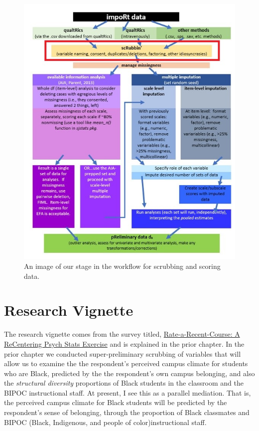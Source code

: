 \documentclass[
  english,
]{book}
\begin{document}
\begin{figure}
\centering
\includegraphics{images/Ch02/wrkflow_prelim.jpg}
\caption{An image of our stage in the workflow for scrubbing and scoring data.}
\end{figure}

\hypertarget{research-vignette-1}{%
\section{Research Vignette}\label{research-vignette-1}}

The research vignette comes from the survey titled, \href{https://spupsych.az1.qualtrics.com/jfe/form/SV_b2cClqAlLGQ6nLU}{Rate-a-Recent-Course: A ReCentering Psych Stats Exercise} and is explained in the prior chapter. In the prior chapter we conducted super-preliminary scrubbing of variables that will allow us to examine the the respondent's perceived campus climate for students who are Black, predicted by the the respondent's own campus belonging, and also the \emph{structural diversity} proportions of Black students in the classroom and the BIPOC instructional staff. At present, I see this as a parallel mediation. That is, the perceived campus climate for Black students will be predicted by the respondent's sense of belonging, through the proportion of Black classmates and BIPOC (Black, Indigenous, and people of color)instructional staff.
\end{document}
